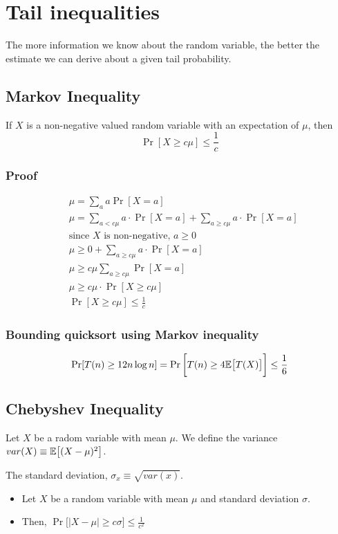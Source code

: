 \section{Tail inequalities}

The more information we know about the random variable, the better the estimate we can derive
about a given tail probability.

\subsection{Markov Inequality}
If $X$ is a non-negative valued random variable with an expectation of $\mu$, then
$$
\Pr[X \geq c \mu] \leq \frac{1}{c}
$$

\subsubsection{Proof}
\begin{align*}
&\mu = \sum_a a \Pr[X = a] \\
&\mu = \sum_{a < c \mu} a \cdot \Pr[X = a] + \sum_{a \geq c \mu} a \cdot \Pr[X = a] \\
&\text{since $X$ is non-negative, $a \geq 0$} \\
&\mu \geq 0 + \sum_{a \geq c \mu} a \cdot \Pr[X = a] \\
&\mu \geq c \mu \sum_{a \geq c \mu} \Pr[X = a] \\
&\mu \geq c \mu \cdot \Pr [X \geq c \mu] \\
&\Pr[X \geq c \mu] \leq \frac{1}{c}
\end{align*}

\subsubsection{Bounding quicksort using Markov inequality}
$$\Pr [T(n) \geq 12 n \log n] = \Pr \bigg[T(n) \geq 4 \mathbb{E}\big[ T(X) \big]\bigg] \leq \frac{1}{6}$$

\subsection{Chebyshev Inequality}
Let $X$ be a radom variable with mean $\mu$. We define the variance
$var(X) \equiv \mathbb{E}\big[ (X - \mu)^2 \big]$.

The standard deviation, $\sigma_x \equiv \sqrt{var(x)}$.

\begin{itemize}
    \item Let $X$ be a random variable with mean $\mu$ and standard deviation $\sigma$.
    \item Then, $\Pr \big[ \big| X - \mu| \geq c \sigma \big] \leq \frac{1}{c^2}$
\end{itemize}


